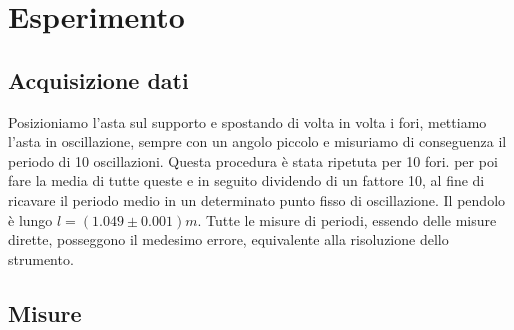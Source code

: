 \documentclass[a4paper,10pt]{article}
\begin{document}
\section{Esperimento}
\subsection{Acquisizione dati}
Posizioniamo l'asta sul supporto e spostando di volta in volta i fori, mettiamo l'asta in oscillazione, sempre con un angolo piccolo e misuriamo di conseguenza il periodo di 10 oscillazioni. Questa procedura è stata ripetuta per 10 fori. per poi fare la media di tutte queste e in seguito dividendo di un fattore 10, al fine di ricavare
il periodo medio in un determinato punto fisso di oscillazione.  
Il pendolo è lungo $l=(1.049 \pm 0.001)m$.
Tutte le misure di periodi, essendo delle misure dirette, posseggono il medesimo errore, equivalente alla risoluzione
dello strumento.

\subsection{Misure}
\end{document}
